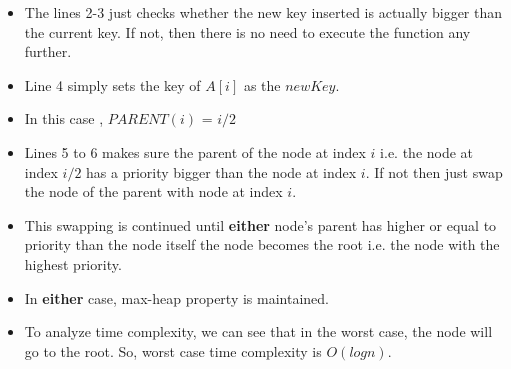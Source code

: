 \begin{itemize}
    \item The lines 2-3 just checks whether the new key inserted is actually bigger than the current key. If not, then there is no need to execute the function any further.
    \item Line 4 simply sets the key of $A[i]$ as the $newKey$.
    \item In this case ,   $PARENT(i)$  = $i/2$
    \item Lines 5 to 6 makes sure the parent of the node at index $i$ i.e. the node at index $i/2$ has a priority bigger than the node at index $i$. If not then just swap the node of the parent with node at index $i$.
    \item This swapping is continued until \textbf{either} node's parent has higher or equal to priority than the node itself  the node becomes the root i.e. the node with the highest priority.
    \item In \textbf{either} case, max-heap property is maintained.
    \item To analyze time complexity, we can see that in the worst case, the node will go to the root. So, worst case time complexity is $O(log n)$.
\end{itemize}